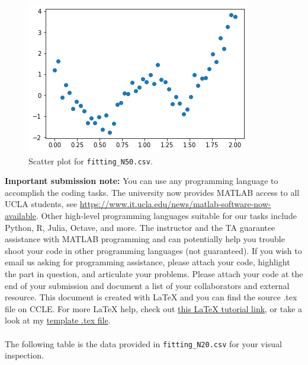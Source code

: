 \documentclass[12pt,a4paper]{article}
\begin{document}
\begin{enumerate}[label=(\alph*)]
\begin{figure}[h]
\centering
\includegraphics[scale=0.6]{TP1_fitting_N50}
\caption{Scatter plot for \texttt{fitting\_N50.csv}.}
\label{fig:N50}
\end{figure}
\end{enumerate}
%
\textbf{Important submission note:}
You can use any programming language to accomplish the coding tasks. The university now provides MATLAB access to all UCLA students, see \href{https://www.it.ucla.edu/news/matlab-software-now-available}{https://www.it.ucla.edu/news/matlab-software-now-available}. Other high-level programming languages suitable for our tasks include Python, R, Julia, Octave, and more. The instructor and the TA guarantee assistance with MATLAB programming and can potentially help you trouble shoot your code in other programming languages (not guaranteed). If you wish to email us asking for programming assistance, please attach your code, highlight the part in question, and articulate your problems. Please attach your code at the end of your submission and document a list of your collaborators and external resource. This document is created with \LaTeX{} and you can find the source .tex file on CCLE. For more \LaTeX{} help, check out \href{https://www.maths.tcd.ie/~dwilkins/LaTeXPrimer/}{this \LaTeX{} tutorial link}, or take a look at my \href{https://raw.githubusercontent.com/evastgh/ps/master/template.tex}{template .tex file}. \\
\\
The following table is the data provided in \texttt{fitting\_N20.csv} for your visual inspection. 
\end{document}
